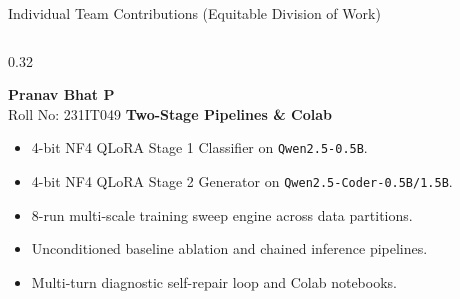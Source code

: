 \documentclass[aspectratio=169,10pt]{beamer}
\begin{document}
\begin{frame}{Individual Team Contributions (Equitable Division of Work)}
\begin{columns}[T]
    \begin{column}{0.32\textwidth}
      \begin{block}{\textbf{Pranav Bhat P}\\[1pt]\scriptsize Roll No: 231IT049}
        \textbf{Two-Stage Pipelines \& Colab}
        \vspace{2pt}
        \begin{itemize}\itemsep=2pt\tiny
          \item 4-bit NF4 QLoRA Stage 1 Classifier on \texttt{Qwen2.5-0.5B}.
          \item 4-bit NF4 QLoRA Stage 2 Generator on \texttt{Qwen2.5-Coder-0.5B/1.5B}.
          \item 8-run multi-scale training sweep engine across data partitions.
          \item Unconditioned baseline ablation and chained inference pipelines.
          \item Multi-turn diagnostic self-repair loop and Colab notebooks.
        \end{itemize}
      \end{block}
    \end{column}
  \end{columns}
\end{frame}
\end{document}
